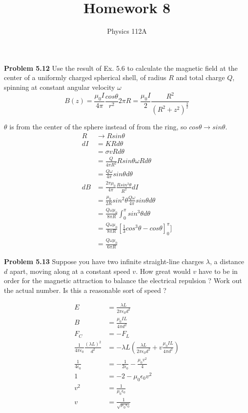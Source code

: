 \documentclass{article}
\title{Homework 8}
\author{Physics 112A}
\date{}
\begin{document}
\maketitle

\textbf{Problem 5.12}
Use the result of Ex. 5.6 to calculate the magnetic field at the center of a uniformly charged spherical shell, of radius $R$ and total charge $Q$, spinning at constant angular velocity $\omega$
$$B(z) = \frac{\mu_0 I}{4 \pi} \frac{cos\theta}{r^2} 2 \pi R = \frac{\mu_0 I}{2} \frac{R^2}{(R^2 + z^2)^{\frac{3}{2}}}$$

$\theta$ is from the center of the sphere instead of from the ring, so $cos\theta \rightarrow sin\theta$.
\begin{equation*}
\begin{split}
	R & \rightarrow R sin\theta \\
	dI & = K R d\theta \\
	& = \sigma v R d\theta \\
	& = \frac{Q}{4 \pi R^2} R sin\theta \omega R d\theta \\
	& = \frac{Q \omega}{4 \pi} sin\theta d\theta \\
	dB & = \frac{2 \pi \mu_0}{4 \pi} \frac{R sin^2\theta}{R^2} dI \\
	& = \frac{\mu_0}{2 R} sin^2\theta \frac{Q \omega}{4 \pi} sin\theta d\theta \\
	& = \frac{Q \omega \mu_0}{8 \pi R} \int_0^\pi sin^3\theta d\theta \\
	& = \frac{Q \omega \mu_0}{8 \pi R} [\frac{1}{3} cos^3\theta - cos\theta]_0^\pi] \\
	& = \boxed{\frac{Q \omega \mu_0}{6 \pi R}}
\end{split}
\end{equation*}

\textbf{Problem 5.13}
Suppose you have two infinite straight-line charges $\lambda$, a distance $d$ apart, moving along at a constant speed $v$.
How great would $v$ have to be in order for the magnetic attraction to balance the electrical repulsion ?
Work out the actual number.
Is this a reasonable sort of speed ?

\begin{equation*}
\begin{split}
	E & = \frac{\lambda L}{2 \pi \epsilon_0 d^2} \\
	B & = \frac{\mu_0 I L}{4 \pi d^2} \\
	F_C & = - F_L \\
	\frac{1}{4 \pi \epsilon_0} \frac{(\lambda L)^2}{d^2} & = - \lambda L (\frac{\lambda L}{2 \pi \epsilon_0 d^2} + v \frac{\mu_0 I L}{4 \pi d^2}) \\
	\frac{1}{4 \epsilon_0} & = - \frac{1}{2 \epsilon_0} - \frac{\mu_0 v^2}{4} \\
	1 & = - 2 - \mu_0 \epsilon_0 v^2 \\
	 v^2 & = \frac{1}{\mu_0 \epsilon_0} \\
	 v & = \boxed{\frac{1}{\sqrt{\mu_0 \epsilon_0}}}
\end{split}
\end{equation*}
\end{document}
